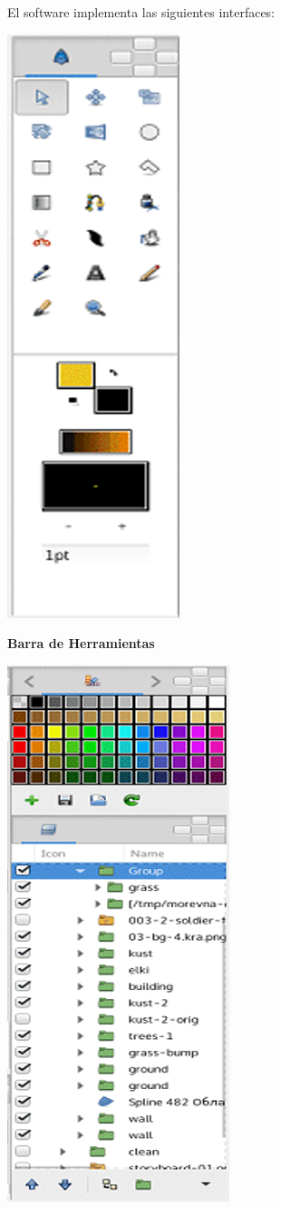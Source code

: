 \documentclass[10pt,a4paper]{article}
\begin{document}
El software implementa las siguientes interfaces:
\begin{center}
\includegraphics[scale=1]{Imagen1.png}

\textbf{Barra de Herramientas}
\vspace{\baselineskip}

\includegraphics[scale=1]{Imagen2.png}


\end{center}
\end{document}
